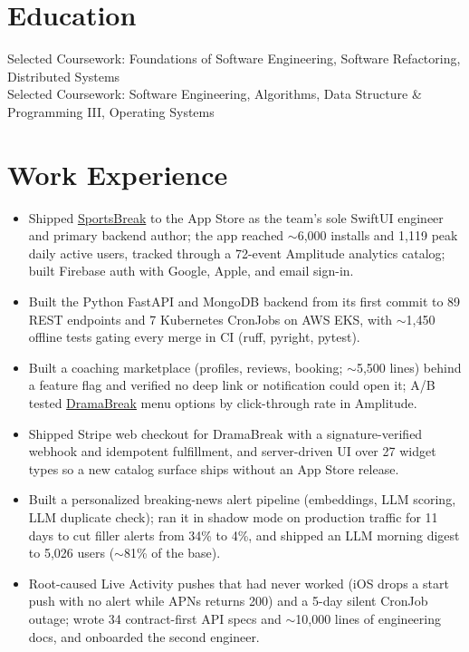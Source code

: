 \documentclass[11pt, letterpaper]{article}
\begin{document}

\section{Education}
Selected Coursework: Foundations of Software Engineering, Software Refactoring, Distributed Systems\\[1pt]
Selected Coursework: Software Engineering, Algorithms, Data Structure \& Programming III, Operating Systems

\section{Work Experience}
\begin{itemize}
  \item Shipped \href{https://apps.apple.com/app/id6762649287}{SportsBreak} to the App Store as the team's sole SwiftUI engineer and primary backend author; the app reached $\sim$6{,}000 installs and 1{,}119 peak daily active users, tracked through a 72-event Amplitude analytics catalog; built Firebase auth with Google, Apple, and email sign-in.
  \item Built the Python FastAPI and MongoDB backend from its first commit to 89 REST endpoints and 7 Kubernetes CronJobs on AWS EKS, with $\sim$1{,}450 offline tests gating every merge in CI (ruff, pyright, pytest).
  \item Built a coaching marketplace (profiles, reviews, booking; $\sim$5{,}500 lines) behind a feature flag and verified no deep link or notification could open it; A/B tested \href{https://apps.apple.com/app/id6758861738}{DramaBreak} menu options by click-through rate in Amplitude.
  \item Shipped Stripe web checkout for DramaBreak with a signature-verified webhook and idempotent fulfillment, and server-driven UI over 27 widget types so a new catalog surface ships without an App Store release.
  \item Built a personalized breaking-news alert pipeline (embeddings, LLM scoring, LLM duplicate check); ran it in shadow mode on production traffic for 11 days to cut filler alerts from 34\% to 4\%, and shipped an LLM morning digest to 5{,}026 users ($\sim$81\% of the base).
  \item Root-caused Live Activity pushes that had never worked (iOS drops a start push with no alert while APNs returns 200) and a 5-day silent CronJob outage; wrote 34 contract-first API specs and $\sim$10{,}000 lines of engineering docs, and onboarded the second engineer.
\end{itemize}
\end{document}
